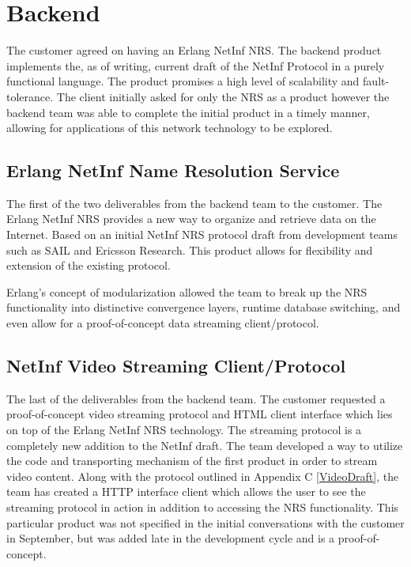 \section {Backend}

The customer agreed on having an Erlang NetInf NRS. The backend product implements the, as of writing, 
current draft of the NetInf Protocol\cite{netinfproto} in a purely functional language. The product promises 
a high level of scalability and fault-tolerance. The client initially asked for only the NRS as a product however 
the backend team was able to complete the initial product in a timely manner, allowing for applications of this network technology to be explored. 


\subsection {Erlang NetInf Name Resolution Service}
The first of the two deliverables from the backend team to the customer. 
The Erlang NetInf NRS provides a new way to organize and retrieve data on the Internet. 
Based on an initial NetInf NRS protocol draft from development teams such as SAIL and Ericsson Research\cite{netinfproto}. 
This product allows for flexibility and extension of the existing protocol.

Erlang's concept of modularization allowed the team to break up the NRS functionality into distinctive convergence layers, 
runtime database switching, and even allow for a proof-of-concept data streaming client/protocol. 

\subsection{NetInf Video Streaming Client/Protocol}

The last of the deliverables from the backend team. The customer requested a proof-of-concept video streaming protocol and 
HTML client interface which lies on top of the Erlang NetInf NRS technology. The streaming protocol is a completely new addition to the NetInf draft\cite{netinfproto}. 
The team developed a way to utilize the code and transporting mechanism of the first product in order to stream video content. 
Along with the protocol outlined in Appendix C \ref{VideoDraft}, the team has created a HTTP interface client which allows the 
user to see the streaming protocol in action in addition to accessing the NRS functionality. This particular product was not specified in 
the initial conversations with the customer in September, but was added late in the development cycle and is a proof-of-concept.

